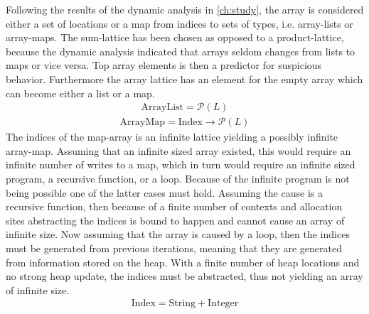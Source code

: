 Following the results of the dynamic analysis in \ref{ch:study}, the array is considered either a set of locations or a map from indices to sets of types, i.e. array-lists or array-maps. The sum-lattice has been chosen as opposed to a product-lattice, because the dynamic analysis indicated that arrays seldom changes from lists to maps or vice versa. Top array elements is then a predictor for suspicious behavior. Furthermore the array lattice has an element for the empty array which can become either a list or a map.  
\begin{align}
\text{ArrayList}= \mathcal{P}( L )
\end{align}
\begin{align}
\text{ArrayMap}=\text{Index} \rightarrow \mathcal{P}( L )
\end{align}
The indices of the map-array is an infinite lattice yielding a possibly infinite array-map. Assuming that an infinite sized array existed, this would require an infinite number of writes to a map, which in turn would require an infinite sized program, a recursive function, or a loop. Because of the infinite program is not being possible one of the latter cases must hold. Assuming the cause is a recursive function, then because of a finite number of contexts and allocation sites abstracting the indices is bound to happen and cannot cause an array of infinite size. Now assuming that the array is caused by a loop, then the indices must be generated from previous iterations, meaning that they are generated from information stored on the heap. With a finite number of heap locations and no strong heap update, the indices must be abstracted, thus not yielding an array of infinite size.
\begin{align}
\text{Index} = \text{String} + \text{Integer}
\end{align}
